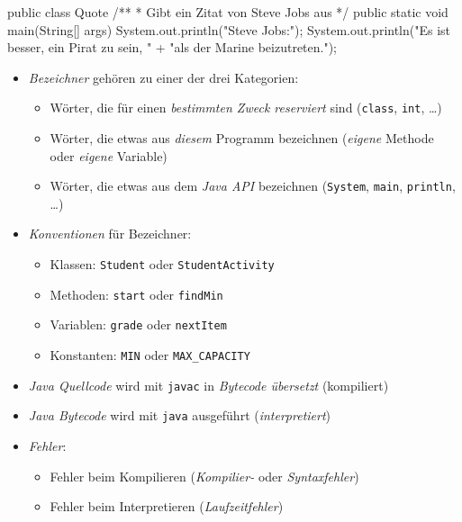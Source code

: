 \documentclass[a4paper,10pt, dvipsnames]{report}
\begin{document}
\begin{javacodebox}
    public class Quote {
        /**
        * Gibt ein Zitat von Steve Jobs aus
        */
        public static void main(String[] args) {
            System.out.println("Steve Jobs:");
            System.out.println("Es ist besser, ein Pirat zu sein, "
                         + "als der Marine beizutreten.");
    }
}
\end{javacodebox}

\begin{itemize}
    \item \textit{Bezeichner} gehören zu einer der drei Kategorien:
    \begin{itemize}
        \item Wörter, die für einen \textit{bestimmten Zweck reserviert} sind (\texttt{class}, \texttt{int}, \ldots )
        \item Wörter, die etwas aus \textit{diesem} Programm bezeichnen (\textit{eigene} Methode oder \textit{eigene} Variable)
        \item Wörter, die etwas aus dem \textit{Java API} bezeichnen (\texttt{System}, \texttt{main}, \texttt{println}, \ldots )
    \end{itemize}
    \item \textit{Konventionen} für Bezeichner:
    \begin{itemize}
        \item Klassen: \texttt{Student} oder \texttt{StudentActivity}
        \item Methoden: \texttt{start} oder \texttt{findMin}
        \item Variablen: \texttt{grade} oder \texttt{nextItem}
        \item Konstanten: \texttt{MIN} oder \texttt{MAX_CAPACITY}
    \end{itemize}
	\item \textit{Java Quellcode} wird mit \texttt{javac} in \textit{Bytecode übersetzt} (kompiliert)
	\item \textit{Java Bytecode} wird mit \texttt{java} ausgeführt (\textit{interpretiert})
	\item \textit{Fehler}:
	\begin{itemize}
        \item Fehler beim Kompilieren (\textit{Kompilier-} oder \textit{Syntaxfehler})
        \item Fehler beim Interpretieren (\textit{Laufzeitfehler})

\end{itemize}
\end{itemize}
\end{document}
